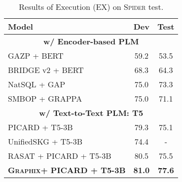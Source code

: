 \documentclass[letterpaper]{article} \usepackage{aaai23}  \usepackage{times}  \usepackage{helvet}  \usepackage{courier}  \usepackage[hyphens]{url}  \usepackage{graphicx} \usepackage{amsmath}
\newcommand{\graphix}{\textsc{Graphix}\xspace}
\begin{document}
\begin{table}[h]
\centering 
    \begin{tabular}{l|cc}
    \toprule
    \textbf{Model} & \textbf{Dev} & \textbf{Test} \\
    \midrule\midrule
    \multicolumn{3}{c}{\textbf{w/ Encoder-based PLM}} \\
    \midrule
    GAZP + BERT & 59.2 & 53.5 \\
    BRIDGE v2 + BERT & 68.3 & 64.3  \\
    NatSQL + GAP & 75.0  & 73.3 \\
    SMBOP + GRAPPA & 75.0 & 71.1 \\
    \midrule\midrule
    \multicolumn{3}{c}{\textbf{w/ Text-to-Text PLM: \textsc{T5}}} \\
    \midrule
    PICARD + T5-3B & 79.3  & 75.1  \\
    UnifiedSKG + T5-3B & 74.4 & - \\
    RASAT + PICARD + T5-3B & 80.5 & 75.5 \\
    \midrule
    \textbf{\graphix + PICARD + T5-3B} & \textbf{81.0} & \textbf{77.6} \\
    \bottomrule
    \end{tabular}\caption{Results of Execution (EX) on \textsc{Spider} test.}
  \label{tab:test_ex}
\end{table}
\end{document}
